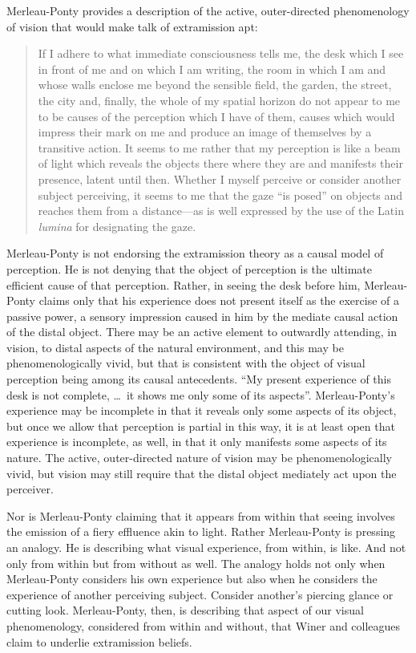 \documentclass[12pt]{article}
\begin{document}
Merleau-Ponty provides a description of the active, outer-directed phenomenology of vision that would make talk of extramission apt:
\begin{quote}
	If I adhere to what immediate consciousness tells me, the desk which I see in front of me and on which I am writing, the room in which I am and whose walls enclose me beyond the sensible field, the garden, the street, the city and, finally, the whole of my spatial horizon do not appear to me to be causes of the perception which I have of them, causes which would impress their mark on me and produce an image of themselves by a transitive action. It seems to me rather that my perception is like a beam of light which reveals the objects there where they are and manifests their presence, latent until then. Whether I myself perceive or consider another subject perceiving, it seems to me that the gaze ``is posed'' on objects and reaches them from a distance---as is well expressed by the use of the Latin \emph{lumina} for designating the gaze. 
\end{quote}
Merleau-Ponty is not endorsing the extramission theory as a causal model of perception. He is not denying that the object of perception is the ultimate efficient cause of that perception. Rather, in seeing the desk before him, Merleau-Ponty claims only that his experience does not present itself as the exercise of a passive power, a sensory impression caused in him by the mediate causal action of the distal object. There may be an active element to outwardly attending, in vision, to distal aspects of the natural environment, and this may be phenomenologically vivid, but that is consistent with the object of visual perception being among its causal antecedents. ``My present experience of this desk is not complete, \ldots\ it shows me only some of its aspects''. Merleau-Ponty's experience may be incomplete in that it reveals only some aspects of its object, but once we allow that perception is partial in this way, it is at least open that experience is incomplete, as well, in that it only manifests some aspects of its nature. The active, outer-directed nature of vision may be phenomenologically vivid, but vision may still require that the distal object mediately act upon the perceiver.

Nor is Merleau-Ponty claiming that it appears from within that seeing involves the emission of a fiery effluence akin to light. Rather Merleau-Ponty is pressing an analogy. He is describing what visual experience, from within, is like. And not only from within but from without as well. The analogy holds not only when Merleau-Ponty considers his own experience but also when he considers the experience of another perceiving subject. Consider another's piercing glance or cutting look. Merleau-Ponty, then, is describing that aspect of our visual phenomenology, considered from within and without, that Winer and colleagues claim to underlie extramission beliefs. 
\end{document}
